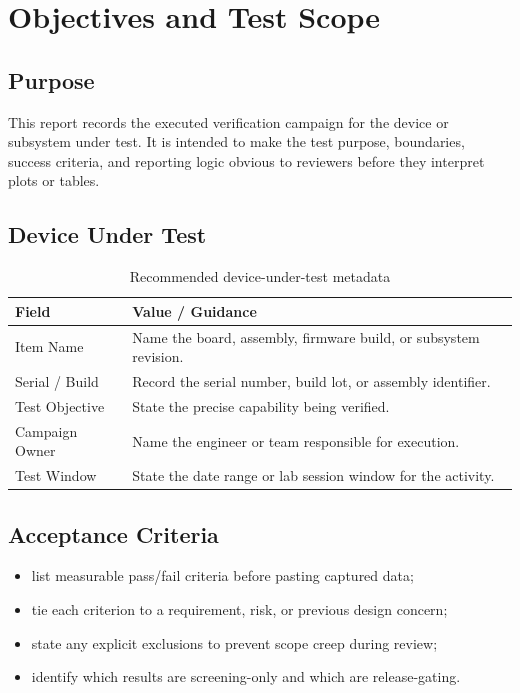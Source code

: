 \section{Objectives and Test Scope}

\subsection{Purpose}
This report records the executed verification campaign for the device or
subsystem under test. It is intended to make the test purpose, boundaries,
success criteria, and reporting logic obvious to reviewers before they interpret
plots or tables.


\subsection{Device Under Test}
\begin{table}[H]
    \centering
    \small
    \begin{tabular}{l p{9.7cm}}
        \toprule
        \textbf{Field} & \textbf{Value / Guidance} \\
        \midrule
        Item Name & Name the board, assembly, firmware build, or subsystem revision. \\
        Serial / Build & Record the serial number, build lot, or assembly identifier. \\
        Test Objective & State the precise capability being verified. \\
        Campaign Owner & Name the engineer or team responsible for execution. \\
        Test Window & State the date range or lab session window for the activity. \\
        \bottomrule
    \end{tabular}
    \caption{Recommended device-under-test metadata}
    \label{tab:dut-metadata}
\end{table}

\subsection{Acceptance Criteria}
\begin{itemize}
    \item list measurable pass/fail criteria before pasting captured data;
    \item tie each criterion to a requirement, risk, or previous design concern;
    \item state any explicit exclusions to prevent scope creep during review;
    \item identify which results are screening-only and which are release-gating.
\end{itemize}

